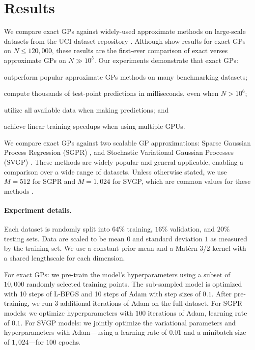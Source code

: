 \section{Results}
\label{sec:largeexact_results}

We compare exact GPs against widely-used approximate methods on large-scale datasets from the UCI dataset repository \cite{asuncion2007uci}.
Although \citet{nguyen2019exact} show results for exact GPs on $N \leq 120,\!000$, these results are the first-ever comparison of exact verses approximate GPs on $N\gg 10^5$.
Our experiments demonstrate that exact GPs:
\begin{enumerate*}
  \item outperform popular approximate GPs methods on many benchmarking datasets;
  \item compute thousands of test-point predictions in milliseconds, even when $N > 10^6$;
  \item utilize all available data when making predictions; and
  \item achieve linear training speedups when using multiple GPUs.
\end{enumerate*}

We compare exact GPs against two scalable GP approximations: Sparse Gaussian Process Regression (SGPR) \cite{titsias2009variational}, and Stochastic Variational Gaussian Processes (SVGP) \cite{hensman2013gaussian}.
These methods are widely popular and general applicable, enabling a comparison over a wide range of datasets.
Unless otherwise stated, we use $M = 512$ for SGPR and $M = 1,\!024$ for SVGP, which are common values for these methods \cite{matthews2017gpflow}.

\paragraph{Experiment details.}
Each dataset is randomly split into $64\%$ training, $16\%$ validation, and $20\%$ testing sets.
Data are scaled to be mean $0$ and standard deviation $1$ as measured by the training set.
We use a constant prior mean and a Mat\'ern 3/2 kernel with a shared lengthscale for each dimension.

For exact GPs: we pre-train the model's hyperparameters using a subset of $10,\!000$ randomly selected training points.
The sub-sampled model is optimized with 10 steps of L-BFGS \citep{liu1989lbfgs} and 10 steps of Adam \citep{kingma2014adam} with step sizes of $0.1$.
After pre-training, we run 3 additional iterations of Adam on the full dataset.
For SGPR models: we optimize hyperparameters with $100$ iterations of Adam, learning rate of $0.1$.
For SVGP models: we jointly optimize the variational parameters and hyperparameters with Adam---using a learning rate of $0.01$ and a minibatch size of $1,\!024$---for $100$ epochs.

